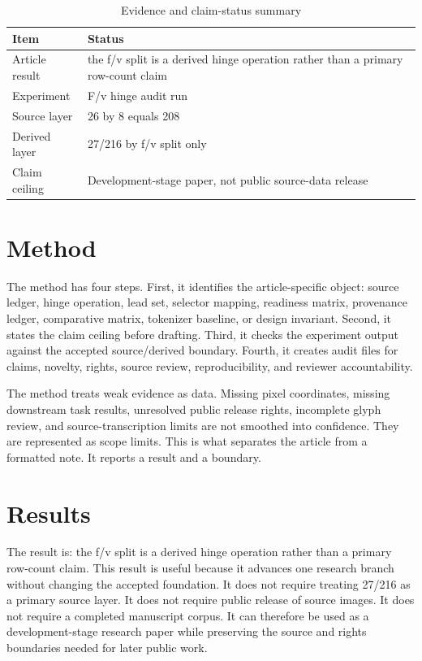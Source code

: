 \documentclass[sigconf,nonacm]{acmart}
\begin{document}
\begin{table}[t]
\caption{Evidence and claim-status summary}
\label{tab:article_na_003}
\begin{tabular}{p{}p{}}
\toprule
Item & Status \\
\midrule
Article result & the f/v split is a derived hinge operation rather than a primary row-count claim \\
Experiment & F/v hinge audit run \\
Source layer & 26 by 8 equals 208 \\
Derived layer & 27/216 by f/v split only \\
Claim ceiling & Development-stage paper, not public source-data release \\
\bottomrule
\end{tabular}
\end{table}


\section{Method}
The method has four steps. First, it identifies the article-specific object:
source ledger, hinge operation, lead set, selector mapping, readiness matrix,
provenance ledger, comparative matrix, tokenizer baseline, or design invariant.
Second, it states the claim ceiling before drafting. Third, it checks the
experiment output against the accepted source/derived boundary. Fourth, it
creates audit files for claims, novelty, rights, source review, reproducibility,
and reviewer accountability.

The method treats weak evidence as data. Missing pixel coordinates, missing
downstream task results, unresolved public release rights, incomplete glyph
review, and source-transcription limits are not smoothed into confidence. They
are represented as scope limits. This is what separates the article from a
formatted note. It reports a result and a boundary.

\section{Results}
The result is: the f/v split is a derived hinge operation rather than a primary row-count claim. This result is useful because it advances one research
branch without changing the accepted foundation. It does not require treating
27/216 as a primary source layer. It does not require public release of source
images. It does not require a completed manuscript corpus. It can therefore be
used as a development-stage research paper while preserving the source and rights
boundaries needed for later public work.
\end{document}
